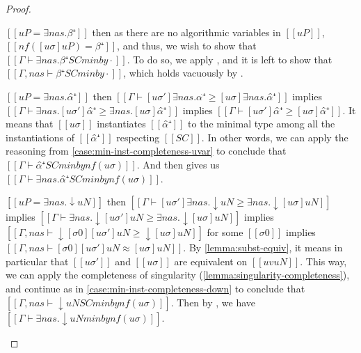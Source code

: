 \begin{proof}
\begin{caseof}

        \item $[[uP = ∃nas.β⁺]]$ then 
            as there are no algorithmic variables in $[[uP]]$, 
            $[[nf([uσ]uP) = β⁺]]$,
            and thus, we wish to show that 
            $[[Γ ⊢ ∃nas.β⁺ SC minby ·]]$.
            To do so, we apply ,
            and it is left to show that $[[Γ, nas ⊢ β⁺ SC minby · ]]$,
            which holds vacuously by .
        \item $[[uP = ∃nas.α̂⁺]]$ then 
            $[[Γ ⊢ [uσ']∃nas.α̂⁺ ≥ [uσ]∃nas.α̂⁺ ]]$ implies 
            $[[Γ ⊢ ∃nas.[uσ']α̂⁺ ≥ ∃nas.[uσ]α̂⁺ ]]$ implies 
            $[[Γ ⊢ [uσ']α̂⁺ ≥ [uσ]α̂⁺ ]]$.
            It means that $[[uσ]]$ instantiates $[[α̂⁺]]$ to the minimal 
            type among all the instantiations of $[[α̂⁺]]$ respecting $[[SC]]$.
            In other words, we can apply the reasoning from 
            \cref{case:min-inst-completeness-uvar}
            to conclude that $[[Γ ⊢ α̂⁺ SC minby nf(uσ) ]]$.
            And then 
            gives us $[[Γ ⊢ ∃nas.α̂⁺ SC minby nf(uσ) ]]$.
        \item $[[uP = ∃nas.↓uN]]$ then 
            $[[Γ ⊢ [uσ']∃nas.↓uN ≥ ∃nas.↓[uσ]uN ]]$ implies 
            $[[Γ ⊢ ∃nas.↓[uσ']uN ≥ ∃nas.↓[uσ]uN ]]$ implies
            $[[Γ, nas ⊢ ↓[σ0][uσ']uN ≥ ↓[uσ]uN ]]$ for some $[[σ0]]$ implies
            $[[Γ, nas ⊢ [σ0][uσ']uN ≈ [uσ]uN ]]$.
            By \cref{lemma:subst-equiv}, it means in particular
            that $[[uσ']]$ and $[[uσ]]$ are equivalent on 
            $[[uv uN]]$. 
            This way, we can apply the completeness of singularity 
            (\cref{lemma:singularity-completeness}), and continue as in
            \cref{case:min-inst-completeness-down}
            to conclude that $[[Γ, nas ⊢ ↓uN SC minby nf(uσ)]]$.
            Then by ,
            we have $[[Γ ⊢ ∃nas.↓uN minby nf(uσ)]]$.
    \end{caseof}
\end{proof}

